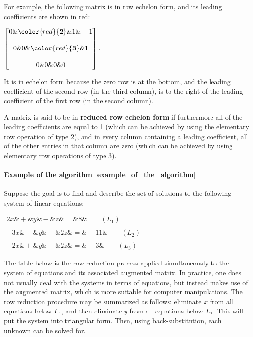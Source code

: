 {{{{{{{{{{{{{{{{For example, the following matrix is in row echelon form, and its
leading coefficients are shown in red:

$\begin{bmatrix}
      0 \& \color{red}{\mathbf{2}} \&                     1   \& -1 \\\\
            0 \&                     0   \& \color{red}{\mathbf{3}} \&  1 \\\\
            0 \&                     0   \&                     0   \&  0
    \end{bmatrix}.$

It is in echelon form because the zero row is at the bottom, and the
leading coefficient of the second row (in the third column), is to the
right of the leading coefficient of the first row (in the second
column).

A matrix is said to be in \textbf{reduced row echelon form} if furthermore
all of the leading coefficients are equal to 1 (which can be achieved by
using the elementary row operation of type 2), and in every column
containing a leading coefficient, all of the other entries in that
column are zero (which can be achieved by using elementary row
operations of type 3).

\paragraph{Example of the algorithm [example_of_the_algorithm]}

Suppose the goal is to find and describe the set of solutions to the
following system of linear equations:

$\begin{alignedat}{4}
      2x \&{}+{}\& y \&{}-{}\&  z \&{}={}\&   8 \& \qquad (L_1) \\\\
           -3x \&{}-{}\& y \&{}+{}\& 2z \&{}={}\& -11 \& \qquad (L_2) \\\\
           -2x \&{}+{}\& y \&{}+{}\& 2z \&{}={}\&  -3 \& \qquad (L_3)
    \end{alignedat}$

The table below is the row reduction process applied simultaneously to
the system of equations and its associated augmented matrix. In
practice, one does not usually deal with the systems in terms of
equations, but instead makes use of the augmented matrix, which is more
suitable for computer manipulations. The row reduction procedure may be
summarized as follows: eliminate $x$ from all
equations below $L_1$, and then
eliminate $y$ from all equations below
$L_2$. This will put the system into
triangular form. Then, using back-substitution, each unknown can be
solved for.

}}}}}}}}}}}}}}}}
